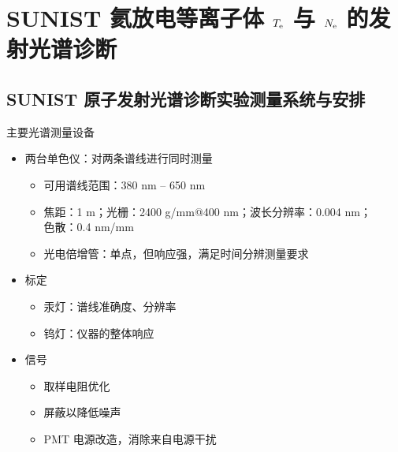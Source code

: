 \section{SUNIST 氦放电等离子体 $T_{\rm e}$ 与 $N_{\rm e}$ 的发射光谱诊断}

\subsection{SUNIST 原子发射光谱诊断实验测量系统与安排}


\begin{frame}{主要光谱测量设备}
	\begin{itemize}
		\item 两台单色仪：对两条谱线进行同时测量
			\begin{itemize}
				\item 可用谱线范围：380 nm -- 650 nm
				\item 焦距：1 m；光栅：2400 g/mm@400 nm；波长分辨率：0.004 nm；
				\\色散：0.4 nm/mm
				\item 光电倍增管：单点，但响应强，满足时间分辨测量要求
			\end{itemize}
		\bigskip
		\item 标定
			\begin{itemize}
				\item 汞灯：谱线准确度、分辨率
				\item 钨灯：仪器的整体响应
			\end{itemize}
		\bigskip
		\item 信号
			\begin{itemize}
				\item 取样电阻优化
				\item 屏蔽以降低噪声
				\item PMT 电源改造，消除来自电源干扰
			\end{itemize}
	\end{itemize}
\end{frame}

